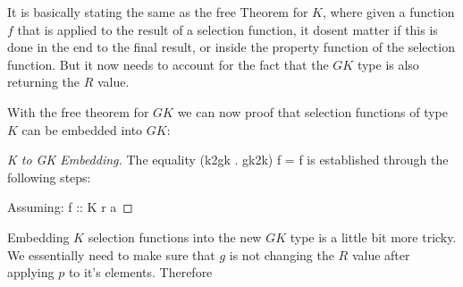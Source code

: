 It is basically stating the same as the free Theorem for $K$, where given a function $f$
that is applied to the result of a selection function, it dosent matter if this is done
in the end to the final result, or inside the property function of the selection function. 
But it now needs to account for the fact that the $GK$ type is also returning the $R$ 
value. 

With the free theorem for $GK$ we can now proof that selection functions of type  $K$ can
be embedded into $GK$:

\begin{proof}[K to GK Embedding]
The equality (k2gk . gk2k) f = f is established through the following steps:

Assuming: f :: K r a

\resethooks
\end{proof}

Embedding $K$ selection functions into the new $GK$ type is a little bit more tricky. We
essentially need to make sure that $g$ is not changing the $R$ value after applying $p$ to
it's elements. Therefore 


